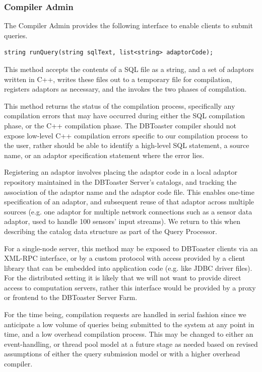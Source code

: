 \documentclass[14pt]{article}
\newcommand{\preliminary}[1]{\textcolor{prelim}{#1}}
\begin{document}
\subsubsection{Compiler Admin}
The Compiler Admin provides the following interface to enable clients to submit queries.

\begin{Verbatim}
string runQuery(string sqlText, list<string> adaptorCode);
\end{Verbatim}

This method accepts the contents of a SQL file as a string, and a set of
adaptors written in C++, writes these files out to a temporary file for
compilation, registers adaptors as necessary, and the invokes the two phases of
compilation.

This method returns the status of the compilation process, specifically any
compilation errors that may have occurred during either the SQL compilation
phase, or the C++ compilation phase. The DBToaster compiler should not expose
low-level C++ compilation errors specific to our compilation process to the
user, rather should be able to identify a high-level SQL statement, a source
name, or an adaptor specification statement where the error lies.

\preliminary{
Registering an adaptor involves placing the adaptor code in a local adaptor
repository maintained in the DBToaster Server's catalogs, and tracking the
association of the adaptor name and the adaptor code file. This enables one-time
specification of an adaptor, and subsequent reuse of that adaptor across
multiple sources (e.g. one adaptor for multiple network connections such as a
sensor data adaptor, used to handle 100 sensors' input streams). We return to
this when describing the catalog data structure as part of the Query Processor.
}

\preliminary{For a single-node server, this method may be exposed to DBToaster
clients via an XML-RPC interface, or by a custom protocol with access provided
by a client library that can be embedded into application code (e.g. like JDBC
driver files). For the distributed setting it is likely that we will not want to
provide direct access to computation servers, rather this interface would be
provided by a proxy or frontend to the DBToaster Server Farm.}

\preliminary{For the time being, compilation requests are handled in serial
fashion since we anticipate a low volume of queries being submitted to the
system at any point in time, and a low overhead compilation process. This may be
changed to either an event-handling, or thread pool model at a future stage as
needed based on revised assumptions of either the query submission model or with
a higher overhead compiler.}
\end{document}
